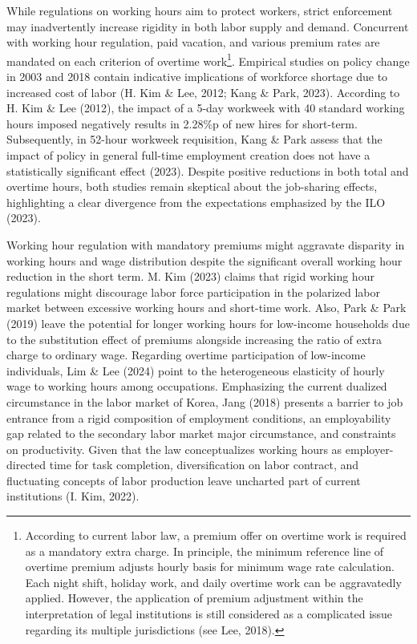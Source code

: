 \documentclass[
  12pt,
]{article}
\begin{document}
While regulations on working hours aim to protect workers, strict
enforcement may inadvertently increase rigidity in both labor supply and
demand. Concurrent with working hour regulation, paid vacation, and
various premium rates are mandated on each criterion of overtime
work\footnote{According to current labor law, a premium offer on
  overtime work is required as a mandatory extra charge. In principle,
  the minimum reference line of overtime premium adjusts hourly basis
  for minimum wage rate calculation. Each night shift, holiday work, and
  daily overtime work can be aggravatedly applied. However, the
  application of premium adjustment within the interpretation of legal
  institutions is still considered as a complicated issue regarding its
  multiple jurisdictions (see Lee, 2018).}. Empirical studies on policy
change in 2003 and 2018 contain indicative implications of workforce
shortage due to increased cost of labor (H. Kim \& Lee, 2012; Kang \&
Park, 2023). According to H. Kim \& Lee (2012), the impact of a 5-day
workweek with 40 standard working hours imposed negatively results in
2.28\%p of new hires for short-term. Subsequently, in 52-hour workweek
requisition, Kang \& Park assess that the impact of policy in general
full-time employment creation does not have a statistically significant
effect (2023). Despite positive reductions in both total and overtime
hours, both studies remain skeptical about the job-sharing effects,
highlighting a clear divergence from the expectations emphasized by the
ILO (2023).

Working hour regulation with mandatory premiums might aggravate
disparity in working hours and wage distribution despite the significant
overall working hour reduction in the short term. M. Kim (2023) claims
that rigid working hour regulations might discourage labor force
participation in the polarized labor market between excessive working
hours and short-time work. Also, Park \& Park (2019) leave the potential
for longer working hours for low-income households due to the
substitution effect of premiums alongside increasing the ratio of extra
charge to ordinary wage. Regarding overtime participation of low-income
individuals, Lim \& Lee (2024) point to the heterogeneous elasticity of
hourly wage to working hours among occupations. Emphasizing the current
dualized circumstance in the labor market of Korea, Jang (2018) presents
a barrier to job entrance from a rigid composition of employment
conditions, an employability gap related to the secondary labor market
major circumstance, and constraints on productivity. Given that the law
conceptualizes working hours as employer-directed time for task
completion, diversification on labor contract, and fluctuating concepts
of labor production leave uncharted part of current institutions (I.
Kim, 2022).
\end{document}
